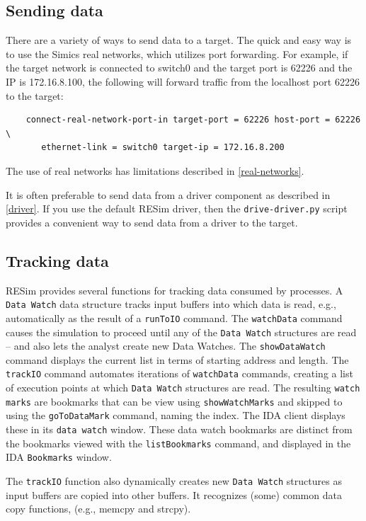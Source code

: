 \documentclass[titlepage]{article}
\begin{document}
\subsection{Sending data}
There are a variety of ways to send data to a target.  The quick and easy way is to use the Simics real networks, which utilizes
port forwarding.  For example, if the target network is connected to switch0 and the target port is 62226 and the IP is
172.16.8.100, the following will forward traffic from the localhost port 62226 to the target: 
\begin{verbatim}
    connect-real-network-port-in target-port = 62226 host-port = 62226 \
       ethernet-link = switch0 target-ip = 172.16.8.200
\end{verbatim}
The use of real networks has limitations described in \ref{real-networks}.

It is often preferable to send data from a driver component as described in \ref{driver}.  If you use the default RESim driver, then the
{\tt drive-driver.py} script provides a convenient way to send data from a driver to the target.

\subsection{Tracking data}
\label{tracking}
RESim provides several functions for tracking data consumed by processes.  A {\tt Data Watch} data structure tracks input buffers into which
data is read, e.g., automatically as the result of a {\tt runToIO} command.  The {\tt watchData} command causes the simulation to proceed until any of the
{\tt Data Watch} structures are read -- and also lets the analyst create new Data Watches. The {\tt showDataWatch} command displays the current list in
terms of starting address and length. 
The {\tt trackIO} command automates iterations of {\tt watchData} commands, creating a list of execution
points at which {\tt Data Watch} structures are read. The resulting {\tt watch marks} are bookmarks that can be view using {\tt showWatchMarks} and
skipped to using the {\tt goToDataMark} command, naming the index.   
The IDA client displays these in its {\tt data watch} window.
These data watch bookmarks are distinct from the bookmarks viewed with the {\tt listBookmarks} command, and displayed in the IDA {\tt Bookmarks} window.

The {\tt trackIO} function also dynamically creates new {\tt Data Watch} structures as input buffers are copied into other buffers.  It recognizes (some) common
data copy functions, (e.g., memcpy and strcpy). 
\end{document}
